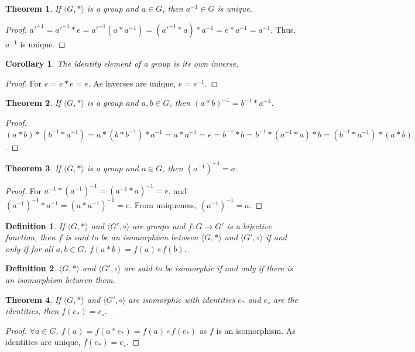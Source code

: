 \documentclass[12pt,oneside]{book}
\theoremstyle{mystyle}
\newtheorem{theorem}{Theorem}[section]
\newtheorem{definition}{Definition}[section]
\newtheorem{corollary}{Corollary}[section]
\begin{document}
\begin{theorem}
If $\langle G, * \rangle$ is a group and $a\in G$, then $a^{-1}\in G$ is unique.
\end{theorem}
\begin{proof}
$a'^{-1} = a'^{-1}*e = a'^{-1}(a*a^{-1}) = (a'^{-1}*a)*a^{-1} = e*a^{-1} = a^{-1}$. Thus, $a^{-1}$ is unique.
\end{proof}

\begin{corollary}
The identity element of a group is its own inverse.
\end{corollary}
\begin{proof}
For $e=e*e = e$. As inverses are unique, $e=e^{-1}$.
\end{proof}

\begin{theorem}
If $\langle G,*\rangle$ is a group and $a,b\in G$, then $(a*b)^{-1} = b^{-1}*a^{-1}$.
\end{theorem}
\begin{proof}
$(a*b)*(b^{-1}*a^{-1}) = a*(b*b^{-1})*a^{-1} = a*a^{-1} = e=b^{-1}*b=b^{-1}*(a^{-1}*a)*b=(b^{-1}*a^{-1})*(a*b)  $.
\end{proof}

\begin{theorem}
If $\langle G,* \rangle$ is a group and $a\in G$, then $(a^{-1})^{-1} = a$.
\end{theorem}
\begin{proof}
For $a^{-1}*(a^{-1})^{-1} = (a^{-1}* a)^{-1} = e$, and $(a^{-1})^{-1}*a^{-1} = (a*a^{-1})^{-1} = e$. From uniqueness, $(a^{-1})^{-1} = a$.
\end{proof}

\begin{definition}
If $\langle G, * \rangle$ and $\langle G',\circ \rangle$ are groups and $f:G\rightarrow G'$ is a bijective function, then $f$ is said to be an isomorphism between $\langle G, * \rangle$ and $\langle G',\circ \rangle$ if and only if for all $a,b\in G$, $f(a*b) =f(a)\circ f(b)$.
\end{definition}

\begin{definition}
$\langle G, *\rangle$ and $\langle G', \circ \rangle$ are said to be isomorphic if and only if there is an isomorphism between them.
\end{definition}

\begin{theorem}
If $\langle G, * \rangle$ and $\langle G', \circ \rangle$ are isomorphic with identities $e_*$ and $e_{\circ}$ are the identities, then $f(e_*) = e_{\circ}$.
\end{theorem}
\begin{proof}
$\forall a\in G,\ f(a)=f(a* e_*) = f(a)\circ f(e_*)$ as $f$ is an isomorphism. As identities are unique, $f(e_*) = e_{\circ}$.
\end{proof}
\end{document}
